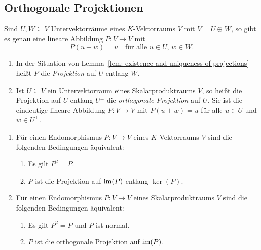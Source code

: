 \subsection{Orthogonale Projektionen}


\begin{lemma}\label{lem: existence and uniqueness of projections}
  Sind $U, W \subseteq V$ Untervektorräume eines $K$-Vektorraums $V$ mit $V = U \oplus W$, so gibt es genau eine lineare Abbildung $P \colon V \to V$ mit
  \[
    P(u + w) = u
    \quad
    \text{für alle $u \in U$, $w \in W$}.
  \]
\end{lemma}


\begin{definition}
  \begin{enumerate}[leftmargin=*, label=\roman*)]
    \item
      In der Situation von Lemma~\ref{lem: existence and uniqueness of projections} heißt $P$ die \emph{Projektion} auf $U$ entlang $W$.
    \item
      Ist $U \subseteq V$ ein Untervektorraum eines Skalarproduktraums $V$, so heißt die Projektion auf $U$ entlang $U^\perp$ die \emph{orthogonale Projektion} auf $U$.
      Sie ist die eindeutige lineare Abbildung $P \colon V \to V$ mit $P(u + w) = u$ für alle $u \in U$ und $w \in U^\perp$.
  \end{enumerate}
\end{definition}


\begin{proposition}
  \begin{enumerate}[leftmargin=*, label=\roman*)]
    \item
      Für einen Endomorphismus $P \colon V \to V$ eines $K$-Vektorraums $V$ sind die folgenden Bedingungen äquivalent:
      \begin{enumerate}[leftmargin=*, label=\alph*)]
        \item
          Es gilt $P^2 = P$.
        \item
          $P$ ist die Projektion auf $\operatorname{im}(P)$ entlang $\ker(P)$.
      \end{enumerate}
    \item
      Für einen Endomorphismus $P \colon V \to V$ eines Skalarproduktraums $V$ sind die folgenden Bedingungen äquivalent:
      \begin{enumerate}[leftmargin=*, label=\alph*)]
        \item
          Es gilt $P^2 = P$ und $P$ ist normal.
        \item
          $P$ ist die orthogonale Projektion auf $\operatorname{im}(P)$.
      \end{enumerate}
  \end{enumerate}
\end{proposition}


